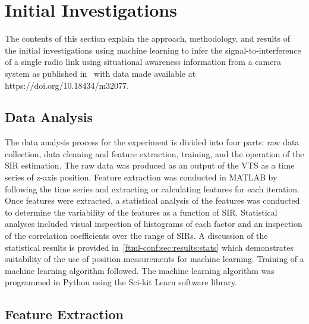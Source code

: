 \section{Initial Investigations}

The contents of this section explain the approach, methodology, and results of the initial investigations using machine learning to infer the signal-to-interference of a single radio link using situational awareness information from a camera system as published in~\cite{CandellISIE2019.Conf} with data made available at https://doi.org/10.18434/m32077.

\subsection{Data Analysis}\label{ftml-conf:sec:dataanalysis}


The data analysis process for the experiment
is divided into four parts: raw data collection, data cleaning and feature extraction, training, and the operation of the SIR estimation.  The raw data was produced as an output of the VTS as a time series of z-axis position.  Feature extraction was conducted in MATLAB by following the time series and extracting or calculating features for each iteration.  Once features were extracted, a statistical analysis of the features was conducted to determine the variability of the features as a function of SIR.  Statistical analyses included visual inspection of histograms of each factor and an inspection of the correlation coefficients over the range  of SIRs.  A discussion of the statistical results is provided in~\ref{ftml-conf:sec:results:stats} which demonstrates suitability of the use of position measurements for machine learning. Training of a machine learning algorithm followed. The machine learning algorithm was programmed in Python using the Sci-kit Learn software library.

\subsection{Feature Extraction}\label{ftml-conf:sec:data:feats}

